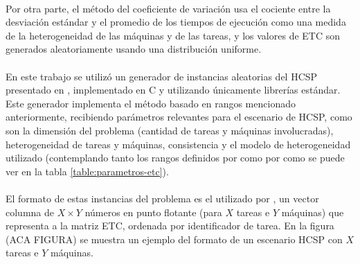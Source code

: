 \begin{table}[h!]
    \centering
    \caption{Parámetros de los modelos ETC}
    \label{table:parametros-etc}
\end{table}

\paragraph{}Por otra parte, el método del coeficiente de variación usa el cociente entre la desviación estándar y el promedio de los tiempos de ejecución como una medida de la heterogeneidad de las máquinas y de las tareas, y los valores de ETC son generados aleatoriamente usando una distribución uniforme.

\paragraph{}En este trabajo se utilizó un generador de instancias aleatorias del HCSP presentado en \citet{bib-doctorado-nesmachnow}, implementado en C y utilizando únicamente librerías estándar. Este generador implementa el método basado en rangos mencionado anteriormente, recibiendo parámetros relevantes para el escenario de HCSP, como son la dimensión del problema (cantidad de tareas y máquinas involucradas), heterogeneidad de tareas y máquinas, consistencia y el modelo de heterogeneidad utilizado (contemplando tanto los rangos definidos por \citet{bib-ali-hc-etc} como por \citet{bib-braun} como se puede ver en la tabla \ref{table:parametros-etc}).

\paragraph{}El formato de estas instancias del problema es el utilizado por \citet{bib-braun}, un vector columna de $X \times Y$ números en punto flotante (para $X$ tareas e $Y$ máquinas) que representa a la matriz ETC, ordenada por identificador de tarea. En la figura (ACA FIGURA) se muestra un ejemplo del formato de un escenario HCSP con $X$ tareas e $Y$ máquinas.

